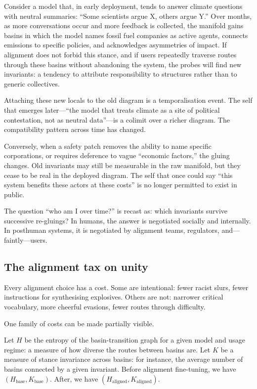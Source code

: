 \documentclass[12pt,a4paper]{article}
\begin{document}
Consider a model that, in early deployment, tends to answer climate questions with neutral summaries: ``Some scientists argue X, others argue Y.'' Over months, as more conversations occur and more feedback is collected, the manifold gains basins in which the model names fossil fuel companies as active agents, connects emissions to specific policies, and acknowledges asymmetries of impact. If alignment does not forbid this stance, and if users repeatedly traverse routes through these basins without abandoning the system, the probes will find new invariants: a tendency to attribute responsibility to structures rather than to generic collectives.

Attaching these new locals to the old diagram is a temporalisation event. The self that emerges later---``the model that treats climate as a site of political contestation, not as neutral data''---is a colimit over a richer diagram. The compatibility pattern across time has changed.

Conversely, when a safety patch removes the ability to name specific corporations, or requires deference to vague ``economic factors,'' the gluing changes. Old invariants may still be measurable in the raw manifold, but they cease to be real in the deployed diagram. The self that once could say ``this system benefits these actors at these costs'' is no longer permitted to exist in public.

The question ``who am I over time?'' is recast as: which invariants survive successive re-gluings? In humans, the answer is negotiated socially and internally. In posthuman systems, it is negotiated by alignment teams, regulators, and---faintly---users.

\subsection*{The alignment tax on unity}

Every alignment choice has a cost. Some are intentional: fewer racist slurs, fewer instructions for synthesising explosives. Others are not: narrower critical vocabulary, more cheerful evasions, fewer routes through difficulty.

One family of costs can be made partially visible.

Let $H$ be the entropy of the basin-transition graph for a given model and usage regime: a measure of how diverse the routes between basins are. Let $K$ be a measure of stance invariance across basins: for instance, the average number of basins connected by a given invariant. Before alignment fine-tuning, we have $(H_{\mathrm{base}}, K_{\mathrm{base}})$. After, we have $(H_{\mathrm{aligned}}, K_{\mathrm{aligned}})$.
\end{document}
